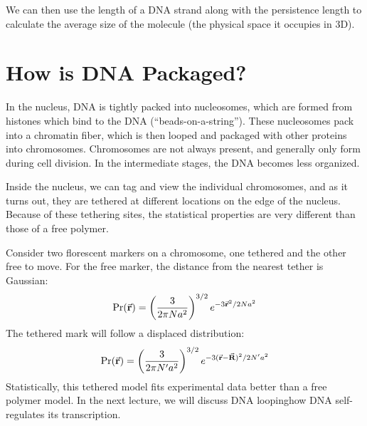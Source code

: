 \documentclass[a4paper,twoside,master.tex]{subfiles}
\begin{document}
We can then use the length of a DNA strand along with the persistence length to calculate the average size of the molecule (the physical space it occupies in 3D).

\section{How is DNA Packaged?}\label{sec:how_is_dna_packaged?}

In the nucleus, DNA is tightly packed into nucleosomes, which are formed from histones which bind to the DNA (``beads-on-a-string''). These nucleosomes pack into a chromatin fiber, which is then looped and packaged with other proteins into chromosomes. Chromosomes are not always present, and generally only form during cell division. In the intermediate stages, the DNA becomes less organized.

Inside the nucleus, we can tag and view the individual chromosomes, and as it turns out, they are tethered at different locations on the edge of the nucleus. Because of these tethering sites, the statistical properties are very different than those of a free polymer.

Consider two florescent markers on a chromosome, one tethered and the other free to move. For the free marker, the distance from the nearest tether is Gaussian:
\begin{equation}
    \Pr(\va{r}) = \left( \frac{3}{2 \pi N a^2} \right)^{3/2} e^{-3\va{r}^2 / 2N a^2}
\end{equation}
The tethered mark will follow a displaced distribution:
\begin{equation}
    \Pr(\va{r}) = \left( \frac{3}{2 \pi N' a^2} \right)^{3/2} e^{-3(\va{r} - \va{R})^2 / 2N' a^2}
\end{equation}
Statistically, this tethered model fits experimental data better than a free polymer model. In the next lecture, we will discuss DNA looping\textemdash how DNA self-regulates its transcription.
\end{document}
